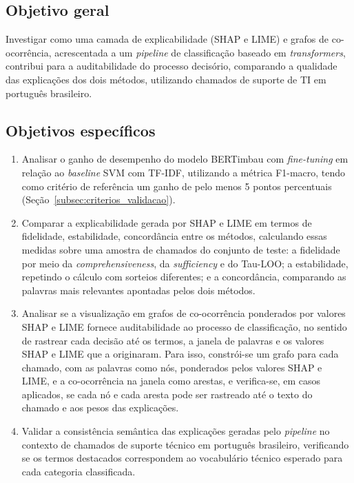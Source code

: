 \documentclass[
    12pt,                %
    openright,           %
    oneside,             %
    a4paper,             %
    english,             %
    brazil               %
]{abntex2}
\begin{document}
\subsection{Objetivo geral}
Investigar como uma camada de explicabilidade (SHAP e LIME) 
e grafos de co-ocorrência, acrescentada a um \textit{pipeline} de classificação baseado em \textit{transformers}, contribui 
para a auditabilidade do processo decisório, comparando a 
qualidade das explicações dos dois métodos, utilizando chamados 
de suporte de TI em português brasileiro.

\subsection{Objetivos específicos}
\begin{enumerate}
    \item Analisar o ganho de desempenho do modelo BERTimbau com \textit{fine-tuning} em relação ao \textit{baseline} SVM com TF-IDF, utilizando a métrica F1-macro, tendo como critério de referência um ganho de pelo menos 5 pontos percentuais (Seção~\ref{subsec:criterios_validacao}).
    
    \item Comparar a explicabilidade gerada por SHAP e LIME em
    termos de fidelidade, estabilidade, concordância entre os
    métodos, calculando essas medidas
    sobre uma amostra de chamados do conjunto de teste:
    a fidelidade por meio da \textit{comprehensiveness}, da \textit{sufficiency} e do Tau-LOO; a estabilidade, repetindo
    o cálculo com sorteios diferentes; e a concordância,
    comparando as palavras mais relevantes apontadas pelos dois métodos.

    \item Analisar se a visualização em grafos de co-ocorrência
    ponderados por valores SHAP e LIME fornece auditabilidade
    ao processo de classificação, no sentido de
    rastrear cada decisão até os termos, a janela de palavras e
    os valores SHAP e LIME que a originaram. Para isso, constrói-se
    um grafo para cada chamado, com as palavras como nós, ponderados
    pelos valores SHAP e LIME, e a co-ocorrência na janela como arestas,
    e verifica-se, em casos aplicados, se cada nó e cada aresta
    pode ser rastreado até o texto do chamado e aos pesos das explicações.

    \item Validar a consistência semântica das explicações 
    geradas pelo \textit{pipeline} no contexto de chamados de 
    suporte técnico em português brasileiro, verificando se os 
    termos destacados correspondem ao vocabulário técnico 
    esperado para cada categoria classificada.
\end{enumerate}
\end{document}
